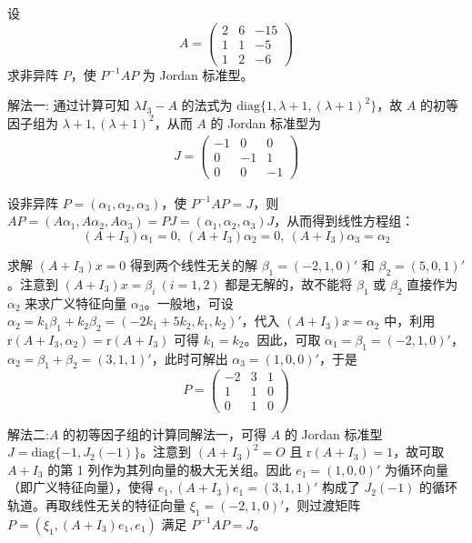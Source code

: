 \documentclass[../../main.tex]{subfiles}%
\begin{document}
\begin{example}\label{example:2235890789}
设 
\[
A = \begin{pmatrix}
2 & 6 & -15 \\
1 & 1 & -5 \\
1 & 2 & -6
\end{pmatrix}
\]
求非异阵 $P$，使 $P^{-1}AP$ 为 Jordan 标准型。
\end{example}
\begin{solution}

{\color{blue}解法一:}
通过计算可知 $\lambda I_3 - A$ 的法式为 $\mathrm{diag}\{1,\lambda + 1,(\lambda + 1)^2\}$，故 $A$ 的初等因子组为 $\lambda + 1,(\lambda + 1)^2$，从而 $A$ 的 Jordan 标准型为
\begin{align*}
J = \begin{pmatrix}
-1 & 0 & 0 \\
0 & -1 & 1 \\
0 & 0 & -1
\end{pmatrix}
\end{align*}

设非异阵 $P = (\alpha_1,\alpha_2,\alpha_3)$，使 $P^{-1}AP = J$，则 $AP = (A\alpha_1,A\alpha_2,A\alpha_3) = PJ = (\alpha_1,\alpha_2,\alpha_3)J$，从而得到线性方程组：
\[(A + I_3)\alpha_1 = 0,\ (A + I_3)\alpha_2 = 0,\ (A + I_3)\alpha_3 = \alpha_2\]

求解 $(A + I_3)x = 0$ 得到两个线性无关的解 $\beta_1 = (-2,1,0)'$ 和 $\beta_2 = (5,0,1)'$。注意到 $(A + I_3)x = \beta_i\ (i = 1,2)$ 都是无解的，故不能将 $\beta_1$ 或 $\beta_2$ 直接作为 $\alpha_2$ 来求广义特征向量 $\alpha_3$。一般地，可设 $\alpha_2 = k_1\beta_1 + k_2\beta_2 = (-2k_1 + 5k_2,k_1,k_2)'$，代入 $(A + I_3)x = \alpha_2$ 中，利用 $\mathrm{r}(A + I_3,\alpha_2) = \mathrm{r}(A + I_3)$ 可得 $k_1 = k_2$。因此，可取 $\alpha_1 = \beta_1 = (-2,1,0)'$，$\alpha_2 = \beta_1 + \beta_2 = (3,1,1)'$，此时可解出 $\alpha_3 = (1,0,0)'$，于是
\[
P = \begin{pmatrix}
-2 & 3 & 1 \\
1 & 1 & 0 \\
0 & 1 & 0
\end{pmatrix}
\]

{\color{blue}解法二:}$A$ 的初等因子组的计算同解法一，可得 $A$ 的 Jordan 标准型 $J = \mathrm{diag}\{-1,J_2(-1)\}$。注意到 $(A + I_3)^2 = O$ 且 $\mathrm{r}(A + I_3) = 1$，故可取 $A + I_3$ 的第 1 列作为其列向量的极大无关组。因此 $e_1 = (1,0,0)'$ 为循环向量（即广义特征向量），使得 $e_1,(A + I_3)e_1 = (3,1,1)'$ 构成了 $J_2(-1)$ 的循环轨道。再取线性无关的特征向量 $\xi_1 = (-2,1,0)'$，则过渡矩阵 $P = (\xi_1,(A + I_3)e_1,e_1)$ 满足 $P^{-1}AP = J$。

\end{solution}
\end{document}
